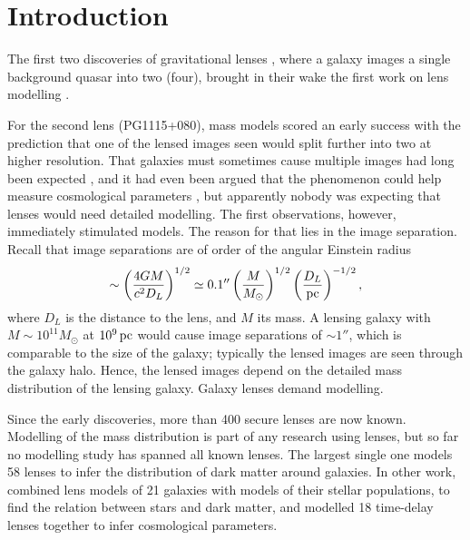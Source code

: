 \documentclass[usenatbib]{mn2e}
\begin{document}
\begin{keywords}
\end{keywords}


\section{Introduction}

The first two discoveries of gravitational lenses
\citep{1979Natur.279..381W,1980Natur.285..641W}, where a galaxy images
a single background quasar into two (four), brought in their wake the
first work on lens modelling
\citep{1981ApJ...244..723Y,1981ApJ...244..736Y}. 


For the second lens
(PG1115+080), mass models scored an early success with the prediction
that one of the lensed images seen would split further into two at
higher resolution.  That galaxies must sometimes cause multiple images
had long been expected \citep{1937ApJ....86..217Z}, and it had even
been argued that the phenomenon could help measure cosmological
parameters \citep{1964MNRAS.128..307R,1966MNRAS.132..101R}, but
apparently nobody was expecting that lenses would need detailed
modelling.  The first observations, however, immediately stimulated
models.  The reason for that lies in the image separation. Recall that
image separations are of order of the angular Einstein radius
\begin{equation}
\sim \left(\frac{4GM}{c^2 D_L}\right)^{1/2}
\simeq 0.1'' \left(\frac{M}{M_\odot}\right)^{1/2}
             \left(\frac{D_L}{\rm pc}\right)^{-1/2},
\end{equation}
where $D_L$ is the distance to the lens, and $M$ its mass.  A lensing
galaxy with $M\sim10^{11}M_\odot$ at $10^9\rm\,pc$ would cause image
separations of $\sim1''$, which is comparable to the size of the
galaxy; typically the lensed images are seen through the galaxy halo.
Hence, the lensed images depend on the detailed mass distribution of
the lensing galaxy.  Galaxy lenses demand modelling.

Since the early discoveries, more than 400 secure lenses are now
known. Modelling of the mass distribution is part of any research
using lenses, but so far no modelling study has spanned all known
lenses.  The largest single one \citep{2009ApJ...703L..51K} models 58
lenses to infer the distribution of dark matter around galaxies.  In
other work, \cite{2011ApJ...740...97L} combined lens models of 21
galaxies with models of their stellar populations, to find the
relation between stars and dark matter, and \cite{2014MNRAS.437..600S}
modelled 18 time-delay lenses together to infer cosmological
parameters.
\end{document}
